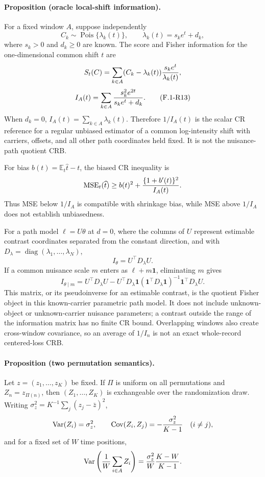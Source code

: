 \paragraph{Proposition (oracle local-shift information).}
For a fixed window $A$, suppose independently
\[
 C_k\sim\operatorname{Pois}\{\lambda_k(t)\},
 \qquad \lambda_k(t)=s_ke^t+d_k,
\]
where $s_k>0$ and $d_k\ge0$ are known.  The score and Fisher information
for the one-dimensional common shift $t$ are
\[
 S_t(C)=\sum_{k\in A}(C_k-\lambda_k(t))
        {s_ke^t\over\lambda_k(t)},
\]
\begin{equation}
 I_A(t)=\sum_{k\in A}{s_k^2e^{2t}\over s_ke^t+d_k}. \tag{F.1-R13}
\end{equation}
When $d_k=0$, $I_A(t)=\sum_{k\in A}\lambda_k(t)$.  Therefore
$1/I_A(t)$ is the scalar CR reference for a regular unbiased estimator
of a common log-intensity shift with carriers, offsets, and all other
path coordinates held fixed.  It is not the nuisance-path quotient
CRB.

For bias $b(t)=\mathbb E_t\widehat t-t$, the biased CR inequality is
\[
 \operatorname{MSE}_t(\widehat t)
 \ge b(t)^2+{\{1+b'(t)\}^2\over I_A(t)}.
\]
Thus MSE below $1/I_A$ is compatible with shrinkage bias, while MSE
above $1/I_A$ does not establish unbiasedness.

For a path model $\ell=U\theta$ at $d=0$, where the columns of $U$
represent estimable contrast coordinates separated from the constant
direction, and with
$D_\lambda=\operatorname{diag}(\lambda_1,\ldots,\lambda_N)$,
\[
 I_\theta=U^\top D_\lambda U.
\]
If a common nuisance scale $m$ enters as $\ell+m\mathbf1$, eliminating
$m$ gives
\[
 I_{\theta\mid m}=U^\top D_\lambda U
 -U^\top D_\lambda\mathbf1
  (\mathbf1^\top D_\lambda\mathbf1)^{-1}
  \mathbf1^\top D_\lambda U.
\]
This matrix, or its pseudoinverse for an estimable contrast, is the
quotient Fisher object in this known-carrier parametric path model.  It
does not include unknown-object or unknown-carrier nuisance parameters;
a contrast outside the range of the information matrix has no finite CR
bound.  Overlapping windows also create
cross-window covariance, so an average of $1/I_n$ is not an exact
whole-record centered-loss CRB.

\paragraph{Proposition (two permutation semantics).}
Let $z=(z_1,\ldots,z_K)$ be fixed.  If $\Pi$ is uniform on all
permutations and $Z_n=z_{\Pi(n)}$, then $(Z_1,\ldots,Z_K)$ is
exchangeable over the randomization draw.  Writing
$\sigma_z^2=K^{-1}\sum_j(z_j-\bar z)^2$,
\[
 \operatorname{Var}(Z_i)=\sigma_z^2,
 \qquad
 \operatorname{Cov}(Z_i,Z_j)=-{\sigma_z^2\over K-1}\quad(i\ne j),
\]
and for a fixed set of $W$ time positions,
\[
 \operatorname{Var}\left({1\over W}\sum_{i\in A}Z_i\right)
 ={\sigma_z^2\over W}{K-W\over K-1}.
\]

